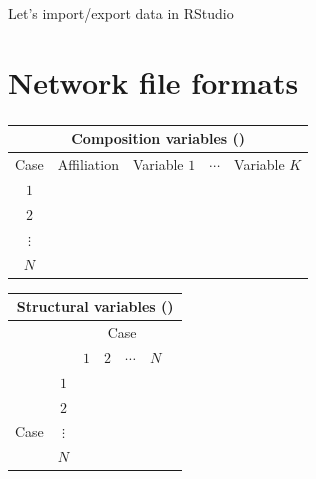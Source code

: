 \documentclass[8pt]{beamer}
\begin{document}

\begin{frame}
\frametitle{\insertsection}

Let's import/export data in RStudio

\end{frame}






\section{Network file formats}

\bgroup
{}
\begin{frame}[plain]{}
\begin{center}
\color{white}{\Huge\insertsection}
\end{center}
\end{frame}
\egroup


\begin{frame}
\frametitle{\insertsection}

\footnotesize
\centering
\begin{tabular}{ccccc}
\multicolumn{5}{c}{Composition variables ({\color{blue}{attributes}})}\\
\toprule
Case & Affiliation & Variable $1$ & $\cdots$ & Variable $K$\\
\hline
$1$           \\
$2$           \\
$\vdots$      \\
$N$           \\
\bottomrule
\end{tabular}

\medskip
\medskip
\medskip
\medskip

\footnotesize
\centering
\begin{tabular}{lcccccc}
\multicolumn{7}{c}{Structural variables ({\color{blue}{adjacency matrix}})}\\
\toprule
 &                & \multicolumn{4}{c}{Case}\\
        &        & $1$ & $2$ & $\cdots$ & $N$\\
\hline
        &    $1$           \\
        &    $2$           \\
Case    &    $\vdots$      \\
        &    $N$           \\
\bottomrule
\end{tabular}


\end{frame}
\end{document}
